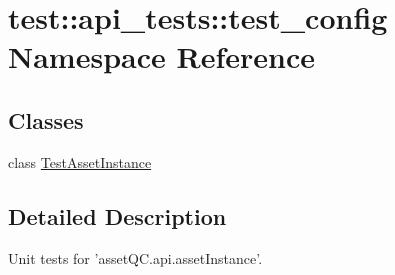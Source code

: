 \hypertarget{namespacetest_1_1api__tests_1_1test__config}{\section{test\-:\-:api\-\_\-tests\-:\-:test\-\_\-config \-Namespace \-Reference}
\label{d1/d69/namespacetest_1_1api__tests_1_1test__config}
}
\subsection*{\-Classes}
\begin{DoxyCompactItemize}
\item 
class \hyperlink{classtest_1_1api__tests_1_1test__config_1_1TestAssetInstance}{\-Test\-Asset\-Instance}
\end{DoxyCompactItemize}


\subsection{\-Detailed \-Description}
\begin{DoxyVerb}
Unit tests for 'assetQC.api.assetInstance'.
\end{DoxyVerb}
 